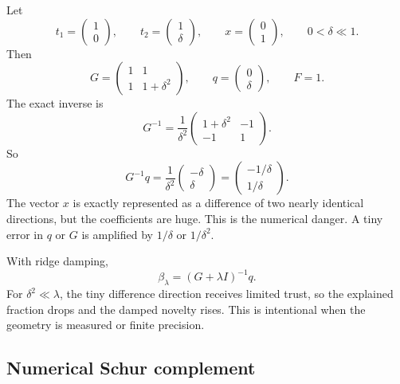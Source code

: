 \documentclass[10pt,twocolumn]{article}
\begin{document}
Let
\begin{equation}
t_1=\begin{pmatrix}1\\0\end{pmatrix},
\qquad
t_2=\begin{pmatrix}1\\\delta\end{pmatrix},
\qquad
x=\begin{pmatrix}0\\1\end{pmatrix},
\qquad 0<\delta\ll1.
\end{equation}
Then
\begin{equation}
G=\begin{pmatrix}1&1\\1&1+\delta^2\end{pmatrix},
\qquad
q=\begin{pmatrix}0\\\delta\end{pmatrix},
\qquad
F=1.
\end{equation}
The exact inverse is
\begin{equation}
G^{-1}=\frac1{\delta^2}
\begin{pmatrix}1+\delta^2&-1\\-1&1\end{pmatrix}.
\end{equation}
So
\begin{equation}
G^{-1}q
=\frac1{\delta^2}
\begin{pmatrix}-\delta\\\delta\end{pmatrix}
=\begin{pmatrix}-1/\delta\\1/\delta\end{pmatrix}.
\end{equation}
The vector $x$ is exactly represented as a difference of two nearly identical directions, but the coefficients are huge. This is the numerical danger. A tiny error in $q$ or $G$ is amplified by $1/\delta$ or $1/\delta^2$.

With ridge damping,
\begin{equation}
\beta_\lambda=(G+\lambda I)^{-1}q.
\end{equation}
For $\delta^2\ll\lambda$, the tiny difference direction receives limited trust, so the explained fraction drops and the damped novelty rises. This is intentional when the geometry is measured or finite precision.

\subsection{Numerical Schur complement}
\end{document}
